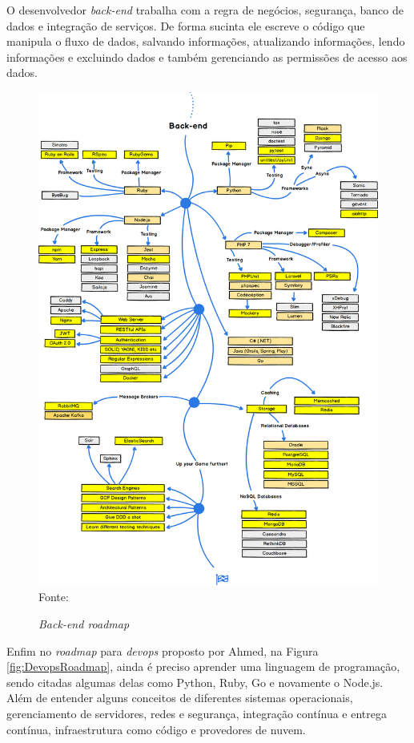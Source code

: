 \documentclass[
	12pt,				%
	openright,			%
	twoside,			%
	a4paper,			%
	english,			%
	brazil				%
	]{abntex2}
\begin{document}
O desenvolvedor \textit{back-end} trabalha com a regra de negócios, segurança, banco de dados e integração de serviços. De forma sucinta ele escreve o código que manipula o fluxo de dados, salvando informações, atualizando informações, lendo informações e excluindo dados e também gerenciando as permissões de acesso aos dados. 

\begin{figure}[h!]
	\centering

	\caption{\textit{Back-end roadmap}} \label{fig:BackendRoadmap}
    \includegraphics[scale=0.34]{backend-roadmap} \\
    Fonte: {\cite{morelli_roadmap}}

\end{figure}

Enfim no \textit{roadmap} para \textit{devops} proposto por Ahmed\cite{ahmedse_roadmap}, na Figura \ref{fig:DevopsRoadmap}, ainda é preciso aprender uma linguagem de programação, sendo citadas algumas delas como Python, Ruby, Go e novamente o Node.js. Além de entender alguns conceitos de diferentes sistemas operacionais, gerenciamento de servidores, redes e segurança, integração contínua e entrega contínua, infraestrutura como código e provedores de nuvem.
\end{document}
